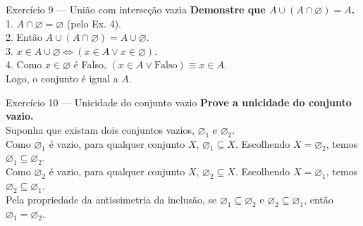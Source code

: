 \documentclass[12pt]{article}
\begin{document}
\begin{block}{Exercício 9 — União com interseção vazia}
\textbf{Demonstre que $A \cup (A \cap \varnothing)=A$.} \\
1. $A \cap \varnothing = \varnothing$ (pelo Ex. 4). \\
2. Então $A \cup (A \cap \varnothing) = A \cup \varnothing$. \\
3. $x \in A \cup \varnothing \iff (x \in A \lor x \in \varnothing)$. \\
4. Como $x \in \varnothing$ é Falso, $(x \in A \lor \text{Falso}) \equiv x \in A$. \\
Logo, o conjunto é igual a $A$.
\end{block}

 
\begin{block}{Exercício 10 — Unicidade do conjunto vazio}
\textbf{Prove a unicidade do conjunto vazio.} \\
Suponha que existam dois conjuntos vazios, $\varnothing_1$ e $\varnothing_2$. \\
Como $\varnothing_1$ é vazio, para qualquer conjunto $X$, $\varnothing_1 \subseteq X$. Escolhendo $X = \varnothing_2$, temos $\varnothing_1 \subseteq \varnothing_2$. \\
Como $\varnothing_2$ é vazio, para qualquer conjunto $X$, $\varnothing_2 \subseteq X$. Escolhendo $X = \varnothing_1$, temos $\varnothing_2 \subseteq \varnothing_1$. \\
Pela propriedade da antissimetria da inclusão, se $\varnothing_1 \subseteq \varnothing_2$ e $\varnothing_2 \subseteq \varnothing_1$, então $\varnothing_1 = \varnothing_2$.
\end{block}
\end{document}
